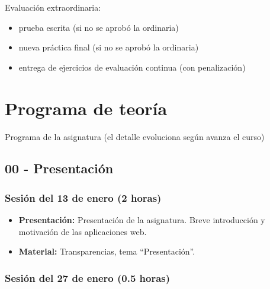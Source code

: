 \documentclass[a4paper,12pt]{article}
\begin{document}
Evaluación extraordinaria:

\begin{itemize}
\item prueba escrita (si no se aprobó la ordinaria)
\item nueva práctica final (si no se aprobó la ordinaria)
\item entrega de ejercicios de evaluación continua (con penalización)
\end{itemize}

\newpage

\section{Programa de teoría}

Programa de la asignatura (el detalle evoluciona según avanza el curso)

\subsection{00 - Presentación}

\subsubsection{Sesión del 13 de enero (2 horas)}

\begin{itemize}
\item \textbf{Presentación:} Presentación de la asignatura. Breve introducción y motivación de las aplicaciones web.
\item \textbf{Material:} Transparencias, tema ``Presentación''.
\end{itemize}

\subsubsection{Sesión del 27 de enero (0.5 horas)}
\end{document}
